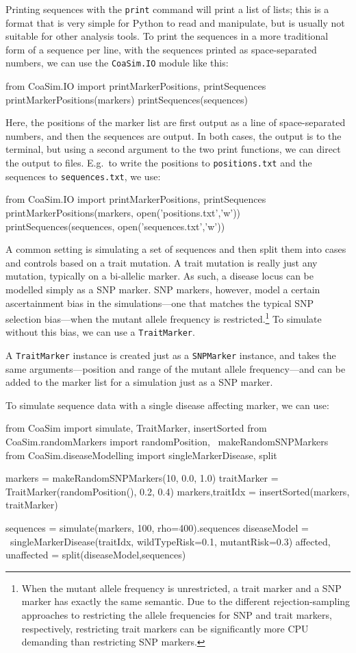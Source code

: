 \documentclass{manual}
\begin{document}
Printing sequences with the \texttt{print} command will print a list
of lists; this is a format that is very simple for Python to read and
manipulate, but is usually not suitable for other analysis tools.  To
print the sequences in a more traditional form of a sequence per line,
with the sequences printed as space-separated numbers, we can use the
\texttt{CoaSim.IO} module like this:
\begin{code}
from CoaSim.IO import printMarkerPositions, printSequences
printMarkerPositions(markers)
printSequences(sequences)
\end{code}
Here, the positions of the marker list are first output as a line of
space-separated numbers, and then the sequences are output.  In both
cases, the output is to the terminal, but using a second argument to
the two print functions, we can direct the output to files.  E.g.\ to
write the positions to \texttt{positions.txt} and the sequences to
\texttt{sequences.txt}, we use:
\begin{code}
from CoaSim.IO import printMarkerPositions, printSequences
printMarkerPositions(markers, open('positions.txt','w'))
printSequences(sequences, open('sequences.txt','w'))
\end{code}

A common setting is simulating a set of sequences and then split them
into cases and controls based on a trait mutation.  A trait mutation
is really just any mutation, typically on a bi-allelic marker.  As
such, a disease locus can be modelled simply as a SNP marker.  SNP
markers, however, model a certain ascertainment bias in the
simulations---one that matches the typical SNP selection bias---when
the mutant allele frequency is restricted.\footnote{When the mutant
  allele frequency is unrestricted, a trait marker and a SNP marker
  has exactly the same semantic.  Due to the different
  rejection-sampling approaches to restricting the allele frequencies
  for SNP and trait markers, respectively, restricting trait markers
  can be significantly more CPU demanding than restricting SNP
  markers.}  To simulate without this bias, we can use a
\texttt{TraitMarker}.

A \texttt{TraitMarker} instance is created just as a
\texttt{SNPMarker} instance, and takes the same arguments---position
and range of the mutant allele frequency---and can be added to the
marker list for a simulation just as a SNP marker.

To simulate sequence data with a single disease affecting marker, we
can use:
\begin{code}
from CoaSim import simulate, TraitMarker, insertSorted
from CoaSim.randomMarkers import randomPosition, \
                                 makeRandomSNPMarkers
from CoaSim.diseaseModelling import singleMarkerDisease, split

markers = makeRandomSNPMarkers(10, 0.0, 1.0)
traitMarker = TraitMarker(randomPosition(), 0.2, 0.4)
markers,traitIdx = insertSorted(markers, traitMarker)

sequences = simulate(markers, 100, rho=400).sequences
diseaseModel = \
    singleMarkerDisease(traitIdx, wildTypeRisk=0.1, 
                                  mutantRisk=0.3)
affected, unaffected = split(diseaseModel,sequences)
\end{code}
\end{document}
